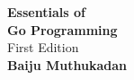 
\begin{titlepage}


\vspace*{2.9in}


\begin{center}

{\fontsize{22}{22}\sf\bfseries Essentials of}\\[.1in]
{\fontsize{22}{22}\sf\bfseries Go Programming}\\[.2in]


{\fontsize{18}{18}\sf First Edition}\\[.4in]

{\fontsize{18}{18}\sf\bfseries Baiju Muthukadan}


\end{center}

\end{titlepage}
